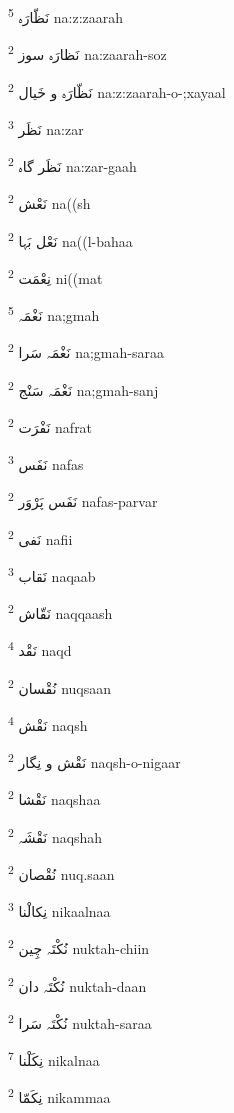 \documentclass[12pt]{article}
\begin{document}
\begin{multicols}{5}
{\ur نَظّارَہ}   \textsuperscript{5} na:z:zaarah

{\ur نَظارَہ سوز}   \textsuperscript{2} na:zaarah-soz

{\ur نَظّارَہ و خَیال}   \textsuperscript{2} na:z:zaarah-o-;xayaal

{\ur نَظَر}   \textsuperscript{3} na:zar

{\ur نَظَر گاہ}   \textsuperscript{2} na:zar-gaah

{\ur نَعْش}   \textsuperscript{2} na((sh

{\ur نَعْل بَہا}   \textsuperscript{2} na((l-bahaa

{\ur نِعْمَت}   \textsuperscript{2} ni((mat

{\ur نَغْمَہ}   \textsuperscript{5} na;gmah

{\ur نَغْمَہ سَرا}   \textsuperscript{2} na;gmah-saraa

{\ur نَغْمَہ سَنْج}   \textsuperscript{2} na;gmah-sanj

{\ur نَفْرَت}   \textsuperscript{2} nafrat

{\ur نَفَس}   \textsuperscript{3} nafas

{\ur نَفَس پَرْوَر}   \textsuperscript{2} nafas-parvar

{\ur نَفی}   \textsuperscript{2} nafii

{\ur نَقاب}   \textsuperscript{3} naqaab

{\ur نَقّاش}   \textsuperscript{2} naqqaash

{\ur نَقْد}   \textsuperscript{4} naqd

{\ur نُقْسان}   \textsuperscript{2} nuqsaan

{\ur نَقْش}   \textsuperscript{4} naqsh

{\ur نَقْش و نِگار}   \textsuperscript{2} naqsh-o-nigaar

{\ur نَقْشا}   \textsuperscript{2} naqshaa

{\ur نَقْشَہ}   \textsuperscript{2} naqshah

{\ur نُقْصان}   \textsuperscript{2} nuq.saan

{\ur نِکالْنا}   \textsuperscript{3} nikaalnaa

{\ur نُکْتَہ چِین}   \textsuperscript{2} nuktah-chiin

{\ur نُکْتَہ دان}   \textsuperscript{2} nuktah-daan

{\ur نُکْتَہ سَرا}   \textsuperscript{2} nuktah-saraa

{\ur نِکَلْنا}   \textsuperscript{7} nikalnaa

{\ur نِکَمّا}   \textsuperscript{2} nikammaa


\end{multicols}
\end{document}
